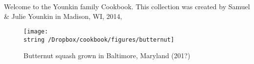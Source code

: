 Welcome to the Younkin family Cookbook.  This collection was created
by Samuel \& Julie Younkin in Madison, WI, 2014,

\begin{figure}[b]
\begin{center}
\texttt{[image: \\string~/Dropbox/cookbook/figures/butternut]}
\end{center}
\caption*{Butternut squash grown in Baltimore, Maryland (201?)}
\end{figure}



